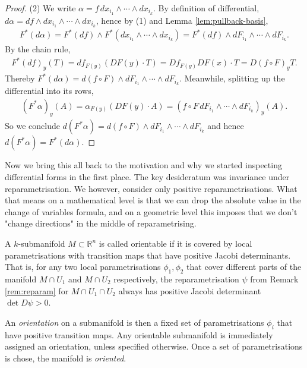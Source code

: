 \begin{proof}
	(2) We write $\alpha = f \, dx_{i_{1}} \wedge \cdots \wedge dx_{i_{k}}$. By definition of differential,
	$d\alpha = df \wedge dx_{i_{1}} \wedge \cdots \wedge dx_{i_{k}}$, hence by (1) and Lemma \ref{lem:pullback-basis},
	\begin{align*}
		F^*(d\alpha ) = F^*(df) \wedge F^*(dx_{i_{1}} \wedge \cdots \wedge dx_{i_{k}}) = F^*(df) \wedge dF_{i_{1}} \wedge \cdots \wedge dF_{i_{k}}.
	\end{align*}
	By the chain rule,
	\begin{align*}
		F^*(df)_{y}(T) = df_{F(y)}(DF(y) \cdot T) = Df_{F(y)} DF(x) \cdot T = D(f \circ F)_{y}T.
	\end{align*}
	Thereby $F^*(d\alpha ) = d(f \circ F) \wedge dF_{i_{1}} \wedge \cdots \wedge dF_{i_{k}}$. Meanwhile, splitting up the differential into its rows,
	\begin{align*}
		(F^*\alpha)_{y}(A) = \alpha_{F(y)}(DF(y) \cdot A) = (f \circ F \, dF_{i_{1}} \wedge \cdots \wedge dF_{i_{k}})_{y}(A).
	\end{align*}
	So we conclude $d(F^*\alpha ) = d(f \circ F) \wedge dF_{i_{1}} \wedge \cdots \wedge dF_{i_{k}}$ and hence $d(F^*\alpha ) = F^*(d \alpha )$.
\end{proof}

Now we bring this all back to the motivation and why we started inspecting differential forms in the first place. The key desideratum was invariance under reparametrisation. We however, consider only positive reparametrisations. What that means on a mathematical level is that we can drop the absolute value in the change of variables formula, and on a geometric level this imposes that we don't "change directions" in the middle of reparametrising. 

\begin{definition}\label{def:orientable-subm}
	A $k$-submanifold $M \subset \mathbb{R}^{n}$ is called orientable if it is covered by local parametrisations with transition maps that have positive Jacobi determinants. That is, for any two local parametrisations $\phi_{1}, \phi_{2}$ that cover different parts of the manifold $M \cap U_{1}$ and $M \cap U_{2}$ respectively, the reparametrisation $\psi$ from Remark \ref{rem:reparam} for $M \cap U_{1} \cap U_{2}$ always has positive Jacobi determinant $\det D\psi > 0$.

	An \textit{orientation} on a submanifold is then a fixed set of parametrisations $\phi_{i}$ that have positive transition maps. Any orientable submanifold is immediately assigned an orientation, unless specified otherwise. Once a set of parametrisations is chose, the manifold is \textit{oriented}.
\end{definition}

